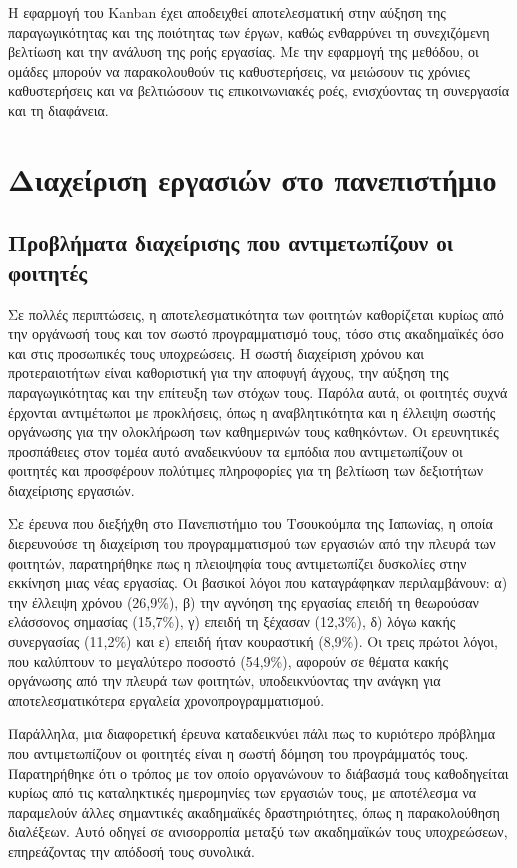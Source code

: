             Η εφαρμογή του Kanban έχει αποδειχθεί αποτελεσματική στην αύξηση της παραγωγικότητας και της ποιότητας των έργων, καθώς ενθαρρύνει τη συνεχιζόμενη βελτίωση και την ανάλυση της ροής εργασίας. Με την εφαρμογή της μεθόδου, οι ομάδες μπορούν να παρακολουθούν τις καθυστερήσεις, να μειώσουν τις χρόνιες καθυστερήσεις και να βελτιώσουν τις επικοινωνιακές ροές, ενισχύοντας τη συνεργασία και τη διαφάνεια. \cite{AndersonKanban} \cite{Agile_Stellman}


    \section{Διαχείριση εργασιών στο πανεπιστήμιο}
        \subsection{Προβλήματα διαχείρισης που αντιμετωπίζουν οι φοιτητές}
            Σε πολλές περιπτώσεις, η αποτελεσματικότητα των φοιτητών καθορίζεται κυρίως από την οργάνωσή τους και τον σωστό προγραμματισμό τους, τόσο στις ακαδημαϊκές όσο και στις προσωπικές τους υποχρεώσεις. Η σωστή διαχείριση χρόνου και προτεραιοτήτων είναι καθοριστική για την αποφυγή άγχους, την αύξηση της παραγωγικότητας και την επίτευξη των στόχων τους. Παρόλα αυτά, οι φοιτητές συχνά έρχονται αντιμέτωποι με προκλήσεις, όπως η αναβλητικότητα και η έλλειψη σωστής οργάνωσης για την ολοκλήρωση των καθημερινών τους καθηκόντων. Οι ερευνητικές προσπάθειες στον τομέα αυτό αναδεικνύουν τα εμπόδια που αντιμετωπίζουν οι φοιτητές και προσφέρουν πολύτιμες πληροφορίες για τη βελτίωση των δεξιοτήτων διαχείρισης εργασιών.

            Σε έρευνα \cite{Fukuzawa2015} που διεξήχθη στο Πανεπιστήμιο του Τσουκούμπα της Ιαπωνίας, η οποία διερευνούσε τη διαχείριση του προγραμματισμού των εργασιών από την πλευρά των φοιτητών, παρατηρήθηκε πως η πλειοψηφία τους αντιμετωπίζει δυσκολίες στην εκκίνηση μιας νέας εργασίας. Οι βασικοί λόγοι που καταγράφηκαν περιλαμβάνουν: α) την έλλειψη χρόνου (26,9\%), β) την αγνόηση της εργασίας επειδή τη θεωρούσαν ελάσσονος σημασίας (15,7\%), γ) επειδή τη ξέχασαν (12,3\%), δ) λόγω κακής συνεργασίας (11,2\%) και ε) επειδή ήταν κουραστική (8,9\%). Οι τρεις πρώτοι λόγοι, που καλύπτουν το μεγαλύτερο ποσοστό (54,9\%), αφορούν σε θέματα κακής οργάνωσης από την πλευρά των φοιτητών, υποδεικνύοντας την ανάγκη για αποτελεσματικότερα εργαλεία χρονοπρογραμματισμού.

            Παράλληλα, μια διαφορετική έρευνα \cite{Trujillo2020} καταδεικνύει πάλι πως το κυριότερο πρόβλημα που αντιμετωπίζουν οι φοιτητές είναι η σωστή δόμηση του προγράμματός τους. Παρατηρήθηκε ότι ο τρόπος με τον οποίο οργανώνουν το διάβασμά τους καθοδηγείται κυρίως από τις καταληκτικές ημερομηνίες των εργασιών τους, με αποτέλεσμα να παραμελούν άλλες σημαντικές ακαδημαϊκές δραστηριότητες, όπως η παρακολούθηση διαλέξεων. Αυτό οδηγεί σε ανισορροπία μεταξύ των ακαδημαϊκών τους υποχρεώσεων, επηρεάζοντας την απόδοσή τους συνολικά.

